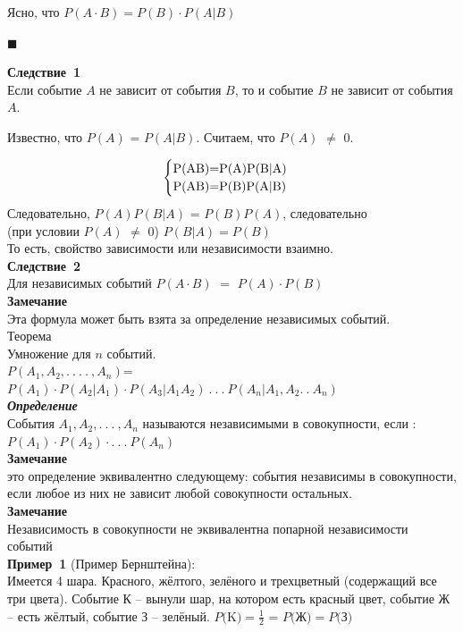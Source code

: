 \documentclass[russian, 12pt, fleqn]{article}
\begin{document}
Ясно, что $P(A\cdot B) = P(B)\cdot P(A|B)$
\begin{flushright}\(\blacksquare\)\end{flushright}
\textbf{Следствие\ 1}\\Если событие $A$ не зависит от события $B$, то и событие $B$ не зависит от события $A$.
\begin{tabbing}
Известно, что $P(A)$ = $P(A|B)$. Считаем, что $P(A)$ $\neq$ $0$.\\
\end{tabbing}
\begin{equation*} 
 \begin{cases}
   $P(AB)$ = $P(A)P(B|A)$\\
   $P(AB)$ = $P(B)P(A|B)$
 \end{cases}
\end{equation*}
Следовательно, $P(A)P(B|A)$ = $P(B)P(A)$, следовательно\\
(при условии $P(A)$ $\neq$ $0$) $P(B|A)=P(B)$\\
То есть, свойство зависимости или независимости взаимно.\\
\textbf{Следствие\ 2}\\ Для независимых событий $P(A\cdot B)$ $=$ $P(A)\cdot P(B)$\\
\textbf{Замечание\ } \\ Эта формула может быть взята за определение независимых событий.\\
$\textbf{Теорема}$\\
Умножение для $n$ событий.\\ $P(A_1, A_2, .\ .\ .\ .\ , A_n)$=$P(A_1)\cdot P(A_2|A_1) \cdot P(A_3|A_1A_2) \ .\ .\ . \ P(A_n|A_1,A_2 .\ .\ A_n)$\\
\textit{\textbf{Определение}}\\События $A_1, A_2, .\ .\ .\ , A_n$ называются независимыми в совокупности, если :\\ $P(A_1)\cdot P(A_2) \cdot .\ .\ .\  P(A_n)$\\
\textbf{Замечание\ } \\ это определение эквивалентно следующему: события независимы в совокупности, если любое из них не зависит любой совокупности остальных.\\
\textbf{Замечание\ } \\ Независимость в совокупности не эквивалентна попарной независимости событий\\
\textbf{Пример\ 1 }(Пример Бернштейна): \\Имеется 4 шара. Красного, жёлтого, зелёного и трехцветный (содержащий все три цвета). Событие К --  вынули шар, на котором есть красный цвет, событие Ж -- есть жёлтый, событие З -- зелёный. $P($K$)=\frac{1}{2}$ = $P($Ж$)=P($З$)$\\
\end{document}
